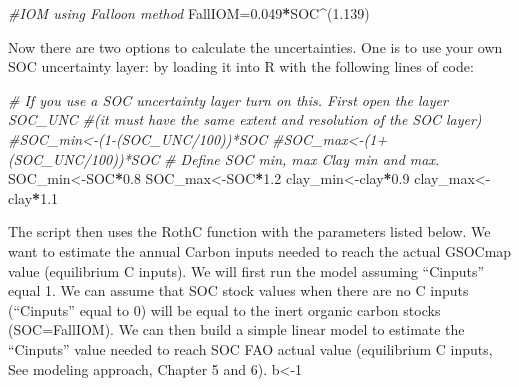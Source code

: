 \documentclass[
  10pt,
  b5paper,
]{book}
\newenvironment{Shaded}{\begin{snugshade}}{\end{snugshade}}
\newcommand{\CommentTok}[1]{\textcolor[rgb]{0.56,0.35,0.01}{\textit{#1}}}
\newcommand{\FloatTok}[1]{\textcolor[rgb]{0.00,0.00,0.81}{#1}}
\newcommand{\NormalTok}[1]{#1}
\newcommand{\OperatorTok}[1]{\textcolor[rgb]{0.81,0.36,0.00}{\textbf{#1}}}
\begin{document}
\begin{Shaded}
\begin{Highlighting}[]
\CommentTok{#IOM using Falloon method}
\NormalTok{FallIOM=}\FloatTok{0.049}\OperatorTok{*}\NormalTok{SOC}\OperatorTok{^}\NormalTok{(}\FloatTok{1.139}\NormalTok{) }
\end{Highlighting}
\end{Shaded}

Now there are two options to calculate the uncertainties. One is to use your own SOC uncertainty layer: by loading it into R with the following lines of code:

\begin{Shaded}
\begin{Highlighting}[]
\CommentTok{# If you use a SOC uncertainty layer turn on this. First open the layer SOC_UNC }
\CommentTok{#(it must have the same extent and resolution of the SOC layer)}
\CommentTok{#SOC_min<-(1-(SOC_UNC/100))*SOC}
\CommentTok{#SOC_max<-(1+(SOC_UNC/100))*SOC}
\CommentTok{# Define SOC min, max Clay min and max. }
\NormalTok{SOC_min<-SOC}\OperatorTok{*}\FloatTok{0.8}
\NormalTok{SOC_max<-SOC}\OperatorTok{*}\FloatTok{1.2}
\NormalTok{clay_min<-clay}\OperatorTok{*}\FloatTok{0.9}
\NormalTok{clay_max<-clay}\OperatorTok{*}\FloatTok{1.1}
\end{Highlighting}
\end{Shaded}

The script then uses the RothC function with the parameters listed below. We want to estimate the annual Carbon inputs needed to reach the actual GSOCmap value (equilibrium C inputs). We will first run the model assuming ``Cinputs'' equal 1. We can assume that SOC stock values when there are no C inputs (``Cinputs'' equal to 0) will be equal to the inert organic carbon stocks (SOC=FallIOM). We can then build a simple linear model to estimate the ``Cinputs'' value needed to reach SOC FAO actual value (equilibrium C inputs, See modeling approach, Chapter 5 and 6).
b\textless-1
\end{document}
